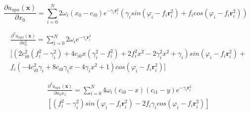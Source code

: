 \documentclass[./\jobname.tex]{subfiles}
\begin{document}
\begin{equation}
\label{eq:uapx_gsin_kernel_x0}
\frac{\partial u_{apx}(\mathbf{x})}{\partial x_0} = \sum_{i=0}^{N} 2 \omega_i (x_0 - c_{i0}) e^{-\gamma_i \mathbf{r}_i^2} (\gamma_i sin(\varphi_i - f_i \mathbf{r}_i^2) + f_i cos(\varphi_i - f_i \mathbf{r}_i^2))
\end{equation}

\begin{equation}
\label{eq:uapx_gsin_kernel_x0_x0}
\begin{split}
& \frac{\partial^2 u_{apx}(\mathbf{x})}{\partial x_0^2} = \sum_{i=0}^{N} 2 \omega_i e^{-\gamma_i \mathbf{r}_i^2} \\ & [ (2 c_{i0}^2 (f_i^2 - \gamma_i^2) + 4 c_{i0} x (\gamma_i^2 - f_i^2) + 2 f_i^2 x^2 - 2 \gamma_i^2 x^2 + \gamma_i) sin(\varphi_i - f_i \mathbf{r}_i^2) + \\ & f_i (-4 c_{i0}^2 \gamma_i + 8 c_{i0} \gamma_i x - 4 \gamma_i x^2 + 1) cos(\varphi_i - f_i \mathbf{r}_i^2) ]
\end{split}
\end{equation}

\begin{equation}
\label{eq:uapx_gsin_kernel_x0_x1}
\begin{split}
& \frac{\partial^2 u_{apx}(\mathbf{x})}{\partial x_0 x_1} = \sum_{i=0}^{N}  4 \omega_i (c_{i0} - x) (c_{i1} - y) e^{-\gamma_i \mathbf{r}_i^2} \\ & \left[(f_i^2 - \gamma_i^2) sin(\varphi_i - f_i \mathbf{r}_i^2) - 2 f_i \gamma_i cos(\varphi_i - f_i \mathbf{r}_i^2)\right]
\end{split}
\end{equation}
\end{document}
